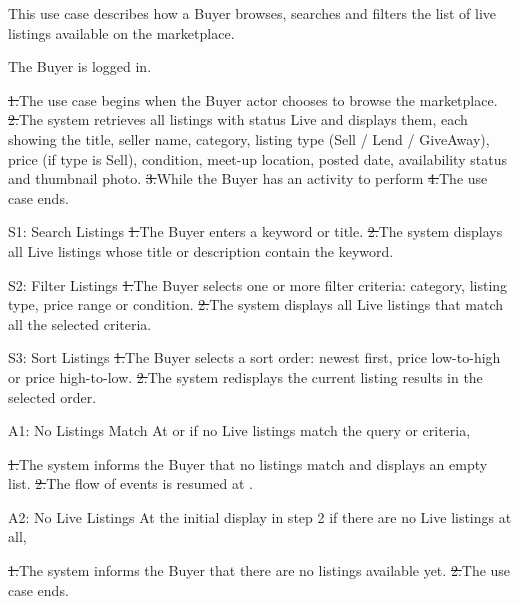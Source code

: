 This use case describes how a Buyer browses, searches and filters the list of live listings available on the marketplace.\par
{}
The Buyer is logged in.\par
{}
\st{1.}{The use case begins when the Buyer actor chooses to browse the marketplace.}
\st{2.}{The system retrieves all listings with status Live and displays them, each showing the title, seller name, category, listing type (Sell / Lend / GiveAway), price (if type is Sell), condition, meet-up location, posted date, availability status and thumbnail photo.}
\st{3.}{While the Buyer has an activity to perform}
\st{4.}{The use case ends.}
\begin{flowblock}{S1: Search Listings}
\st{1.}{The Buyer enters a keyword or title.}
\st{2.}{The system displays all Live listings whose title or description contain the keyword.}
\end{flowblock}
\begin{flowblock}{S2: Filter Listings}
\st{1.}{The Buyer selects one or more filter criteria: category, listing type, price range or condition.}
\st{2.}{The system displays all Live listings that match all the selected criteria.}
\end{flowblock}
\begin{flowblock}{S3: Sort Listings}
\st{1.}{The Buyer selects a sort order: newest first, price low-to-high or price high-to-low.}
\st{2.}{The system redisplays the current listing results in the selected order.}
\end{flowblock}
\begin{flowblock}{A1: No Listings Match}
At  or  if no Live listings match the query or criteria,\par
\st{1.}{The system informs the Buyer that no listings match and displays an empty list.}
\st{2.}{The flow of events is resumed at .}
\end{flowblock}
\begin{flowblock}{A2: No Live Listings}
At the initial display in step 2 if there are no Live listings at all,\par
\st{1.}{The system informs the Buyer that there are no listings available yet.}
\st{2.}{The use case ends.}
\end{flowblock}

